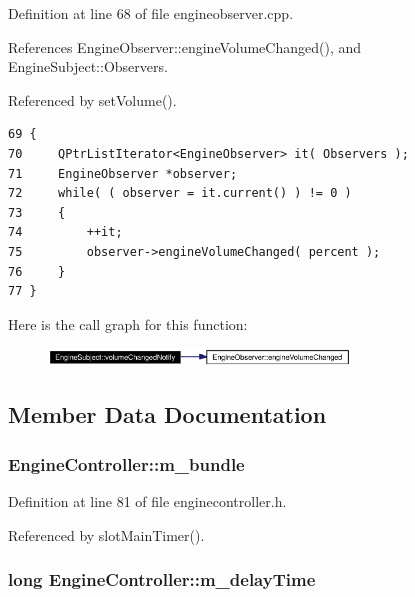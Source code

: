 Definition at line 68 of file engineobserver.cpp.

References Engine\-Observer::engine\-Volume\-Changed(), and Engine\-Subject::Observers.

Referenced by set\-Volume().



\footnotesize\begin{verbatim}69 {
70     QPtrListIterator<EngineObserver> it( Observers );
71     EngineObserver *observer;
72     while( ( observer = it.current() ) != 0 )
73     {
74         ++it;
75         observer->engineVolumeChanged( percent );
76     }
77 }
\end{verbatim}\normalsize 


Here is the call graph for this function:\begin{figure}[H]
\begin{center}
\leavevmode
\includegraphics[width=227pt]{classEngineSubject_EngineSubjectb4_cgraph}
\end{center}
\end{figure}


\subsection{Member Data Documentation}
\subsubsection{ {\bf Engine\-Controller::m\_\-bundle}\hspace{0.3cm}{\tt  [private]}}\label{classEngineController_EngineControllerr1}




Definition at line 81 of file enginecontroller.h.

Referenced by slot\-Main\-Timer().
\subsubsection{\setlength{\rightskip}{0pt plus 5cm}long {\bf Engine\-Controller::m\_\-delay\-Time}\hspace{0.3cm}{\tt  [private]}}\label{classEngineController_EngineControllerr4}




